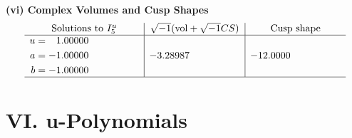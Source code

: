\documentclass[1p]{elsarticle_modified}
\theoremstyle{definition}
\newcommand{\I}{\sqrt{-1}}
\begin{document}
\newpage\flushleft \textbf{(vi) Complex Volumes and Cusp Shapes}
$$\begin{array}{c|c|c}  
\text{Solutions to }I^u_{5}& \I (\text{vol} + \sqrt{-1}CS) & \text{Cusp shape}\\
 \hline 
\begin{aligned}
u &= \phantom{-}1.00000\phantom{ +0.000000I} \\
a &= -1.00000\phantom{ +0.000000I} \\
b &= -1.00000\phantom{ +0.000000I}\end{aligned}
 & -3.28987\phantom{ +0.000000I} & -12.0000\phantom{ +0.000000I}\\
 \hline 
 \end{array}$$\newpage
\newpage\renewcommand{\arraystretch}{1}
\centering \section*{ VI. u-Polynomials}
\end{document}
